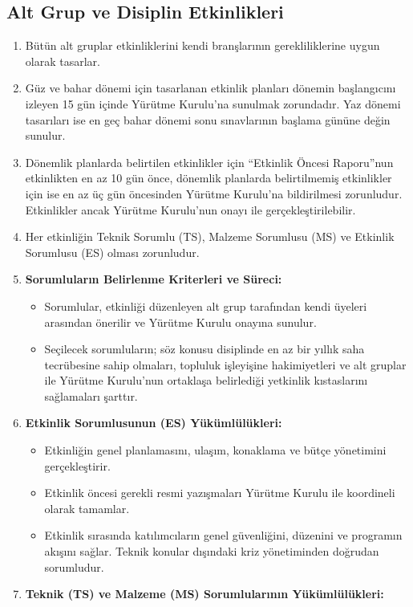 \documentclass[11pt,a4paper]{article}
\begin{document}
\subsection{Alt Grup ve Disiplin Etkinlikleri}
\begin{enumerate}
    \item Bütün alt gruplar etkinliklerini kendi branşlarının gerekliliklerine uygun olarak tasarlar.
    \item Güz ve bahar dönemi için tasarlanan etkinlik planları dönemin başlangıcını izleyen 15 gün içinde Yürütme Kurulu'na sunulmak zorundadır. Yaz dönemi tasarıları ise en geç bahar dönemi sonu sınavlarının başlama gününe değin sunulur.
    \item Dönemlik planlarda belirtilen etkinlikler için “Etkinlik Öncesi Raporu”nun etkinlikten en az 10 gün önce, dönemlik planlarda belirtilmemiş etkinlikler için ise en az üç gün öncesinden Yürütme Kurulu'na bildirilmesi zorunludur. Etkinlikler ancak Yürütme Kurulu'nun onayı ile gerçekleştirilebilir.
    \item Her etkinliğin Teknik Sorumlu (TS), Malzeme Sorumlusu (MS) ve Etkinlik Sorumlusu (ES) olması zorunludur.
    \item \textbf{Sorumluların Belirlenme Kriterleri ve Süreci:}
    \begin{itemize}
        \item Sorumlular, etkinliği düzenleyen alt grup tarafından kendi üyeleri arasından önerilir ve Yürütme Kurulu onayına sunulur.
        \item Seçilecek sorumluların; söz konusu disiplinde en az bir yıllık saha tecrübesine sahip olmaları, topluluk işleyişine hakimiyetleri ve alt gruplar ile Yürütme Kurulu'nun ortaklaşa belirlediği yetkinlik kıstaslarını sağlamaları şarttır.
    \end{itemize}
    \item \textbf{Etkinlik Sorumlusunun (ES) Yükümlülükleri:}
    \begin{itemize}
        \item Etkinliğin genel planlamasını, ulaşım, konaklama ve bütçe yönetimini gerçekleştirir.
        \item Etkinlik öncesi gerekli resmi yazışmaları Yürütme Kurulu ile koordineli olarak tamamlar.
        \item Etkinlik sırasında katılımcıların genel güvenliğini, düzenini ve programın akışını sağlar. Teknik konular dışındaki kriz yönetiminden doğrudan sorumludur.
    \end{itemize}
    \item \textbf{Teknik (TS) ve Malzeme (MS) Sorumlularının Yükümlülükleri:}

\end{enumerate}
\end{document}
